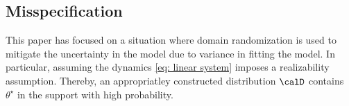 
 \subsection{Misspecification}

 This paper has focused on a situation where domain randomization is used to mitigate the uncertainty in the model due to variance in fitting the model. In particular, assuming the dynamics \eqref{eq: linear system} imposes a realizability assumption. Thereby, an appropriatley constructed distribution $\calD$ contains $\theta^\star$ in the support with high probability. 

